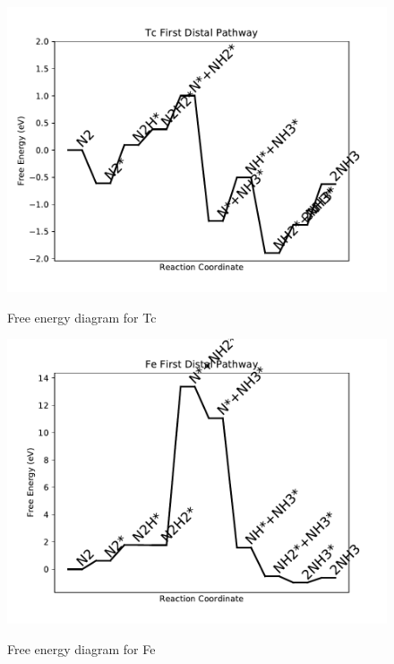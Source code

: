 \documentclass{article}
\begin{document}
\begin{figure}
\includegraphics[width=1\linewidth]{data/plots/Tc_distal_1.pdf}
\label{fig:Tc_distal_1}
\caption{Free energy diagram for Tc}
\end{figure}

\clearpage
\begin{figure}
\includegraphics[width=1\linewidth]{data/plots/Fe_distal_1.pdf}
\label{fig:Fe_distal_1}
\caption{Free energy diagram for Fe}
\end{figure}
\end{document}
